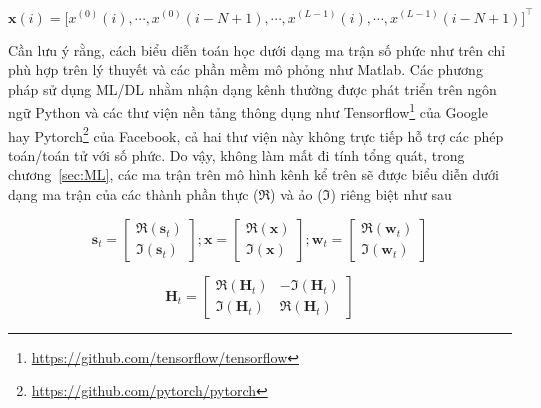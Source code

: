 \begin{equation}
        \mathbf{x}(i) = \big[x^{(0)}(i), \cdots, x^{(0)}(i-N+1), \cdots, 
        x^{(L-1)}(i), \cdots, x^{(L-1)}(i-N+1)\big]^\top
\end{equation} 

Cần lưu ý rằng, cách biểu diễn toán học dưới dạng ma trận số phức như trên chỉ phù hợp trên lý thuyết và các phần mềm mô phỏng như Matlab. Các phương pháp sử dụng ML/DL nhằm nhận dạng kênh thường được phát triển trên ngôn ngữ Python và các thư viện nền tảng thông dụng như Tensorflow\footnote{\url{https://github.com/tensorflow/tensorflow}} của Google hay Pytorch\footnote{\url{https://github.com/pytorch/pytorch}} của Facebook, cả hai thư viện này không trực tiếp hỗ trợ các phép toán/toán tử với số phức. Do vậy, không làm mất đi tính tổng quát, trong chương~\ref{sec:ML}, các ma trận trên mô hình kênh kể trên sẽ được biểu diễn dưới dạng ma trận của các thành phần thực ($\Re$) và ảo ($\Im$) riêng biệt như sau

\begin{equation}
\label{eq:matrixtras1}
    \mathbf{s}_t=\left[\begin{array}{l}
    \Re(\mathbf{s}_t) \\
    \Im(\mathbf{s}_t)
    \end{array}\right] ;
    \mathbf{x}=\left[\begin{array}{l}
    \Re(\mathbf{x}) \\
    \Im(\mathbf{x})
    \end{array}\right] ; 
    \mathbf{w}_t=\left[\begin{array}{l}
    \Re(\mathbf{w}_t) \\
    \Im(\mathbf{w}_t)
    \end{array}\right]
\end{equation}

\begin{equation}
\label{eq:matrixtras2}
    \mathbf{H}_t=\left[\begin{array}{cc}
    \Re(\mathbf{H}_t) & -\Im(\mathbf{H}_t) \\
    \Im(\mathbf{H}_t) & \Re(\mathbf{H}_t)
    \end{array}\right]
\end{equation}

